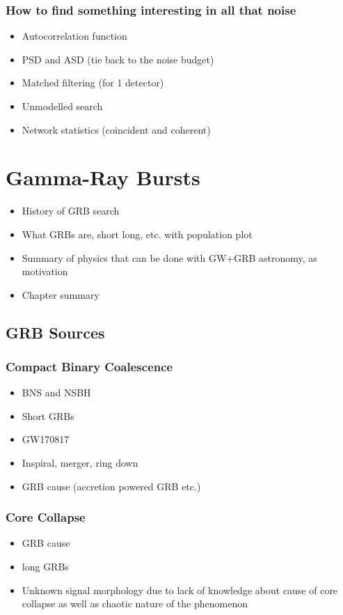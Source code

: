 \documentclass[12pt,twoside,a4paper]{report}
\begin{document}
\subsection{How to find something interesting in all that noise}
\begin{itemize}
\item Autocorrelation function
\item PSD and ASD (tie back to the noise budget) 
\item Matched filtering (for 1 detector)
\item Unmodelled search
\item Network statistics (coincident and coherent) 
\end{itemize}

\chapter{Gamma-Ray Bursts}
\begin{itemize}
\item History of GRB search
\item What GRBs are, short long, etc. with population plot
\item Summary of physics that can be done with GW+GRB astronomy, as motivation
\item Chapter summary
\end{itemize}
\section{GRB Sources}
\subsection{Compact Binary Coalescence}
\begin{itemize}
\item BNS and NSBH
\item Short GRBs
\item GW170817
\item Inspiral, merger, ring down
\item GRB cause (accretion powered GRB etc.)
\end{itemize}
\subsection{Core Collapse}
\begin{itemize}
\item GRB cause
\item long GRBs
\item Unknown signal morphology due to lack of knowledge about cause of core collapse as well as chaotic nature of the phenomenon
\end{itemize}
\end{document}
